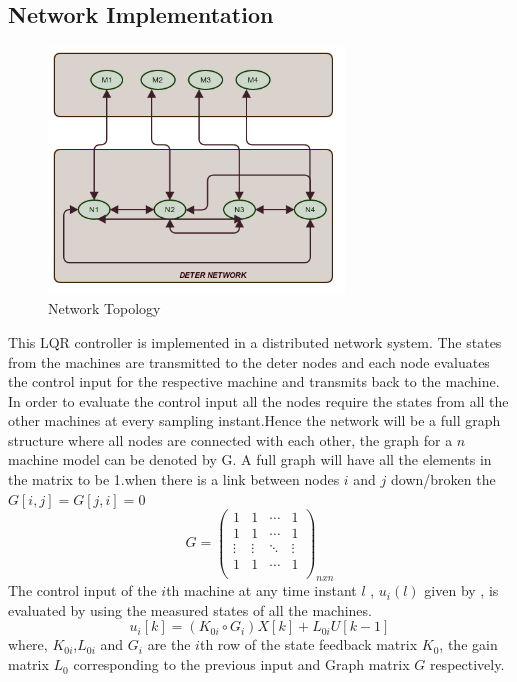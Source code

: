 \documentclass[a4paper]{article}
\begin{document}
\subsection{Network Implementation}
\begin{figure}
\centering
\includegraphics[width=0.7\textwidth]{Network_Setup.png}
\caption{\label{fig:table} Network Topology}
\end{figure}
This LQR controller is implemented in a distributed network system. The states from the machines are transmitted to the deter nodes and each node evaluates the control input for the respective machine and transmits back to the machine. In order to evaluate the control input all the nodes require the states from all the other machines at every sampling instant.Hence the network will be a full graph structure where all nodes are connected with each other, the graph for a $n$ machine model can be denoted by G. A full graph will have all the elements in the matrix to be 1.when there is a link between nodes $i$ and $j$ down/broken the $G[i,j] = G[j,i] = 0$
\begin{equation}
G = 
\begin{pmatrix}
1 &1 &\cdots &1\\
1 &1 &\cdots &1\\
\vdots &\vdots &\ddots &\vdots\\
1 &1 &\cdots &1\\
\end{pmatrix}_{nxn}
\end{equation}
The control input of the $i$th machine at any time instant $l$ , $u_{i}(l)$ given by , is evaluated by using the measured states of all the machines.
\begin{equation}
\label{eq12}
u_{i}[k] = (K_{0i}\circ G_{i}) X[k] + L_{0i}U[k-1]
\end{equation}
where, $K_{0i}$,$L_{0i}$ and $G_{i}$ are the $i$th row of the state feedback matrix $K_{0}$, the gain matrix $L_{0}$ corresponding to the previous input and Graph matrix $G$ respectively.\\
\end{document}
